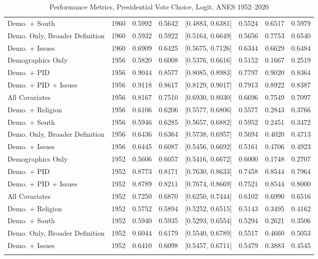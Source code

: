 \begin{longtable}{lrrrlrrr}
  Demo. + South & 1960 & 0.5992 & 0.5642 & [0.4883, 0.6381] & 0.5524 & 0.6517 & 0.5979 \\ 
  Demo. Only, Broader Definition & 1960 & 0.5932 & 0.5922 & [0.5164, 0.6649] & 0.5656 & 0.7753 & 0.6540 \\ 
  Demo. + Issues & 1960 & 0.6909 & 0.6425 & [0.5675, 0.7126] & 0.6344 & 0.6629 & 0.6484 \\ 
  Demographics Only & 1956 & 0.5820 & 0.6008 & [0.5376, 0.6616] & 0.5152 & 0.1667 & 0.2519 \\ 
  Demo. + PID & 1956 & 0.9044 & 0.8577 & [0.8085, 0.8983] & 0.7797 & 0.9020 & 0.8364 \\ 
  Demo. + PID + Issues & 1956 & 0.9118 & 0.8617 & [0.8129, 0.9017] & 0.7913 & 0.8922 & 0.8387 \\ 
  All Covariates & 1956 & 0.8167 & 0.7510 & [0.6930, 0.8030] & 0.6696 & 0.7549 & 0.7097 \\ 
  Demo. + Religion & 1956 & 0.6106 & 0.6206 & [0.5577, 0.6806] & 0.5577 & 0.2843 & 0.3766 \\ 
  Demo. + South & 1956 & 0.5946 & 0.6285 & [0.5657, 0.6882] & 0.5952 & 0.2451 & 0.3472 \\ 
  Demo. Only, Broader Definition & 1956 & 0.6436 & 0.6364 & [0.5738, 0.6957] & 0.5694 & 0.4020 & 0.4713 \\ 
  Demo. + Issues & 1956 & 0.6445 & 0.6087 & [0.5456, 0.6692] & 0.5161 & 0.4706 & 0.4923 \\ 
  Demographics Only & 1952 & 0.5606 & 0.6057 & [0.5416, 0.6672] & 0.6000 & 0.1748 & 0.2707 \\ 
  Demo. + PID & 1952 & 0.8773 & 0.8171 & [0.7630, 0.8633] & 0.7458 & 0.8544 & 0.7964 \\ 
  Demo. + PID + Issues & 1952 & 0.8789 & 0.8211 & [0.7674, 0.8669] & 0.7521 & 0.8544 & 0.8000 \\ 
  All Covariates & 1952 & 0.7250 & 0.6870 & [0.6250, 0.7444] & 0.6102 & 0.6990 & 0.6516 \\ 
  Demo. + Religion & 1952 & 0.5752 & 0.5894 & [0.5252, 0.6515] & 0.5143 & 0.3495 & 0.4162 \\ 
  Demo. + South & 1952 & 0.5940 & 0.5935 & [0.5293, 0.6554] & 0.5294 & 0.2621 & 0.3506 \\ 
  Demo. Only, Broader Definition & 1952 & 0.6044 & 0.6179 & [0.5540, 0.6789] & 0.5517 & 0.4660 & 0.5053 \\ 
  Demo. + Issues & 1952 & 0.6410 & 0.6098 & [0.5457, 0.6711] & 0.5479 & 0.3883 & 0.4545 \\ 
   \bottomrule
\caption{Performance Metrics, Presidential Vote Choice, Logit, ANES 1952--2020} 
\label{tab:ANES_prezvote_logit}
\end{longtable}
